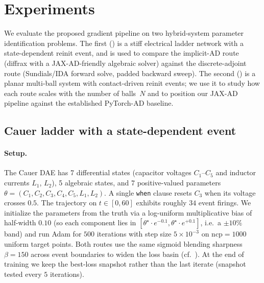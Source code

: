 %

\section{Experiments}
\label{sec:experiments}

We evaluate the proposed gradient pipeline on two hybrid-system parameter
identification problems. The first () is a stiff
electrical ladder network with a state-dependent reinit event, and is
used to compare the implicit-AD route (diffrax with a JAX-AD-friendly
algebraic solver) against the discrete-adjoint route (Sundials/IDA
forward solve, padded backward sweep). The second
() is a planar multi-ball system with
contact-driven reinit events; we use it to study how each route scales
with the number of balls~$N$ and to position our JAX-AD pipeline against
the established PyTorch-AD baseline.

\subsection{Cauer ladder with a state-dependent event}
\label{sec:exp:cauer}

\paragraph{Setup.}
The Cauer DAE has 7 differential states (capacitor voltages $C_1$--$C_5$
and inductor currents $L_1$, $L_2$), 5 algebraic states, and 7
positive-valued parameters
$\theta=(C_1, C_2, C_3, C_4, C_5, L_1, L_2)$. A single \texttt{when}
clause resets $C_3$ when its voltage crosses $0.5$. The trajectory on
$t\in[0, 60]$ exhibits roughly $34$ event firings.
We initialize the parameters from the truth via a log-uniform
multiplicative bias of half-width $0.10$ (so each component lies in
$[\theta^\star\!\cdot\! e^{-0.1},\theta^\star\!\cdot\! e^{+0.1}]$,
i.e.\ a $\pm 10\%$ band) and run Adam for $500$ iterations with step
size $5\!\times\!10^{-3}$ on $\mathrm{ncp}{=}1000$ uniform target
points. Both routes use the same sigmoid blending sharpness
$\beta=150$ across event boundaries to widen the loss basin (cf.\
). At the end of training we keep the
best-loss snapshot rather than the last iterate (snapshot tested every
$5$ iterations).

